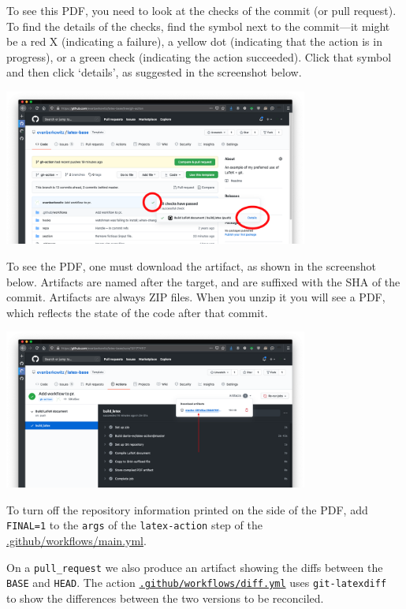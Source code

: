 To see this PDF, you need to look at the checks of the commit (or pull request).
To find the details of the checks, find the symbol next to the commit---it might be a red X (indicating a failure), a yellow dot (indicating that the action is in progress), or a green check (indicating the action succeeded).
Click that symbol and then click `details', as suggested in the screenshot below.
\begin{center}
\includegraphics[width=0.75\textwidth]{figure/github-action-find-details}
\end{center}
To see the PDF, one must download the artifact, as shown in the screenshot below.
Artifacts are named after the target, and are suffixed with the SHA of the commit.
Artifacts are always ZIP files.  When you unzip it you will see a PDF, which reflects the state of the code after that commit.
\begin{center}
\includegraphics[width=0.75\textwidth]{figure/github-action-artifact}
\end{center}
To turn off the repository information printed on the side of the PDF, add \texttt{FINAL=1} to the \texttt{args} of the \texttt{latex-action} step of the \href{https://github.com/evanberkowitz/latex-base/blob/master/.github/workflows/main.yml}{.github/workflows/main.yml}.

On a \texttt{pull\_request} we also produce an artifact showing the diffs between the \texttt{BASE} and \texttt{HEAD}.
The action \href{https://github.com/evanberkowitz/latex-base/blob/master/.github/workflows/diff.yml}{\texttt{.github/workflows/diff.yml}} uses \texttt{git-latexdiff}~\cite{git-latexdiff} to show the differences between the two versions to be reconciled.
